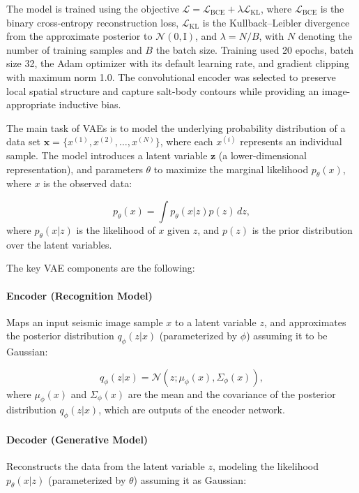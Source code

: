 \documentclass{ieeeaccess}
\begin{document}
The model is trained using the objective $\mathcal{L}=\mathcal{L}_{\mathrm{BCE}}+\lambda\mathcal{L}_{\mathrm{KL}}$, where $\mathcal{L}_{\mathrm{BCE}}$ is the binary cross-entropy reconstruction loss, $\mathcal{L}_{\mathrm{KL}}$ is the Kullback--Leibler divergence from the approximate posterior to $\mathcal{N}(0,\mathrm{I})$, and $\lambda=N/B$, with $N$ denoting the number of training samples and $B$ the batch size. Training used 20 epochs, batch size 32, the Adam optimizer with its default learning rate, and gradient clipping with maximum norm 1.0. The convolutional encoder was selected to preserve local spatial structure and capture salt-body contours while providing an image-appropriate inductive bias.

The main task of VAEs is to model the underlying probability distribution of a data set $\bm{x} = \{x^{(1)}, x^{(2)}, \ldots, x^{(N)}\}$, where each $x^{(i)}$ represents an individual sample. The model introduces a latent variable $\bm{z}$ (a lower-dimensional representation), and parameters $\theta$ to maximize the marginal likelihood $p_\theta(x)$, where $x$ is the observed data:

\begin{equation}
p_\theta(x) = \int p_\theta(x | z) p(z) \, dz,
\end{equation}
where $p_\theta(x | z)$ is the likelihood of $x$ given $z$, and $p(z)$ is the prior distribution over the latent variables.


The key VAE components are the following:

\paragraph{Encoder (Recognition Model)}
Maps an input seismic image sample $x$ to a latent variable $z$, and approximates the posterior distribution $q_\phi(z | x)$ (parameterized by $\phi$) assuming it to be Gaussian:

\begin{equation}
q_\phi(z | x) = \mathcal{N}(z; \mu_\phi(x), \Sigma_\phi(x)),
\end{equation}
where $\mu_\phi(x)$ and $\Sigma_\phi(x)$ are the mean and the covariance of the posterior distribution $q_\phi(z | x)$, which are outputs of the encoder network.

\paragraph{Decoder (Generative Model)}
Reconstructs the data from the latent variable $z$, modeling the likelihood $p_\theta(x | z)$ (parameterized by $\theta$) assuming it as Gaussian:
\end{document}
